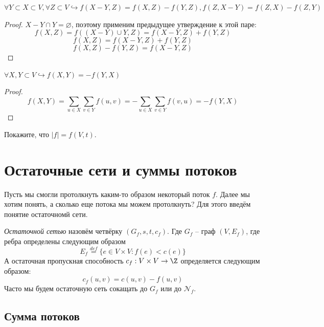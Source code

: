 \Cons $\forall Y \subset X \subset V, \forall Z \subset V \hookrightarrow f(X - Y, Z) = f(X, Z) - f(Y, Z), f(Z, X - Y) = f(Z, X) - f(Z, Y)$
\begin{proof}

    $X - Y \cap Y = \varnothing$, поэтому применим предыдущее утверждение к этой паре:
    \begin{equation*}
        f(X, Z) = f((X - Y) \cup Y, Z) = f(X - Y, Z) + f(Y, Z)
    \end{equation*}
    \begin{equation*}
        f(X, Z) = f(X - Y, Z) + f(Y, Z)
    \end{equation*}
    \begin{equation*}
        f(X, Z) - f(Y, Z) = f(X - Y, Z)
    \end{equation*}
\end{proof}

\St $\forall X, Y \subset V \hookrightarrow f(X, Y) = -f(Y, X)$
\begin{proof}
    \begin{equation*}
        f(X, Y) = \sum\limits_{u \in X} \sum\limits_{v \in Y} f(u, v) = - \sum\limits_{u \in X} \sum\limits_{v \in Y} f(v, u) = -f(Y, X)
    \end{equation*}
\end{proof}

\Exe Покажите, что $|f| = f(V, t)$.


\section{Остаточные сети и суммы потоков}

Пусть мы смогли протолкнуть каким-то образом некоторый поток $f$. Далее мы хотим понять, а сколько еще потока мы можем протолкнуть?
Для этого введём понятие остаточномй сети.

\Def \textit{Остаточной сетью} назовём четвёрку $(G_f, s, t, c_f)$. Где $G_f$ -- граф $(V, E_f)$, где ребра определены следующим образом
\begin{equation*}
    E_f \overset{def}{=} \{ e \in V \times V: f(e) < c(e) \}
\end{equation*}
А остаточная пропускная способность $c_f: V \times V \to \Z$ определяется следующим образом:
\begin{equation*}
    c_f(u, v) = c(u, v) - f(u, v)
\end{equation*}
Часто мы будем остаточную сеть сокащать до $G_f$ или до $\mathcal{N}_f$.

\subsection{Сумма потоков}

